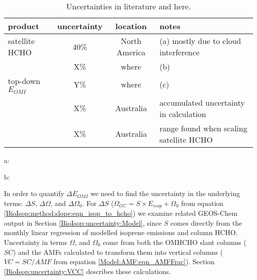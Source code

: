     \begin{table}\begin{threeparttable}
      \caption{Uncertainties in literature and here.}
      \begin{tabular}{ l | c  c  l } 
        \toprule
        product & uncertainty & location & notes \\
        \midrule
        satellite HCHO & 40\% & North America & (a) mostly due to cloud interference \\
         & X\% & where & (b) \\
        top-down $E_{OMI}$ & Y\% & where & (c) \\
         & X\% & Australia & accumulated uncertainty in calculation \\
         & X\% & Australia & range found when scaling satellite HCHO \\
        \bottomrule
      \end{tabular}
      \begin{tablenotes} 
        \item a: \textcite{Millet2006,Palmer2006}
        \item b: 
      \end{tablenotes}
      \label{BioIsop:uncertainty:eomi:tab_lit_uncertainties}
    \end{threeparttable}\end{table}
    
    In order to quantify $\Delta{E_{OMI}}$ we need to find the uncertainty in the underlying terms: $\Delta{S}$, $\Delta{\Omega}$, and $\Delta{\Omega_0}$. 
    For $\Delta{S}$ ($\Omega_{GC} = S \times E_{isop} + \Omega_0$ from equation \ref{BioIsop:method:slope:eqn_isop_to_hcho}) we examine related GEOS-Chem output in Section \ref{BioIsop:uncertainty:Model}, since $S$ comes directly from the monthly linear regression of modelled isoprene emissions and column HCHO.
    Uncertainty in terms $\Omega$, and $\Omega_0$ come from both the OMHCHO slant columns ($SC$) and the AMFs calculated to transform them into vertical columns ($VC = SC/AMF$ from equation \ref{Model:AMF:eqn_AMFFrac}).
    Section \ref{BioIsop:uncertainty:VCC} describes these calculations.
    
